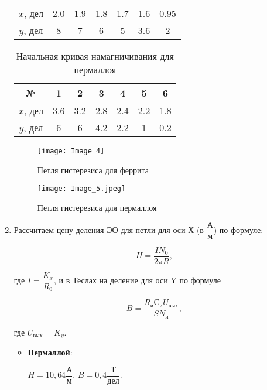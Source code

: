 \begin{enumerate}
\begin{table}[h!]
\begin{center}
\begin{tabular}{|c|c|c|c|c|c|c|}
				$ x $, дел & 2.0 & 1.9 & 1.8 & 1.7 & 1.6 & 0.95  \\
				$ y $, дел & 8 & 7 & 6 & 5 & 3.6 & 2  \\
				\hline
				
			\end{tabular}
		\end{center}
	\end{table}
	

	
	
	\begin{table}[h!]
		\caption{Начальная кривая намагничивания для пермаллоя}
		\begin{center}
			\begin{tabular}{|c|c|c|c|c|c|c|} 
				\hline 
				№ &  1 &  2 & 3 & 4 & 5 &  6    \\ 	\hline
				
				$ x $, дел & 3.6 & 3.2 & 2.8 & 2.4 & 2.2 & 1.8  \\
				$ y $, дел & 6 & 6 & 4.2 & 2.2 & 1 & 0.2  \\
				\hline
				
			\end{tabular}
		\end{center}
	\end{table}

\begin{figure}[h!]
	\centering
	\texttt{[image: Image\_4]}
	\caption{Петля гистерезиса для феррита}
\end{figure}

\newpage

\begin{figure}[h!]
	\centering
	\texttt{[image: Image\_5.jpeg]}
	\caption{Петля гистерезиса для пермаллоя}
\end{figure}

\item  Рассчитаем  цену деления ЭО для петли для оси Х (в $\dfrac{А}{м}$) по формуле:

$$H=\dfrac{IN_{0}}{2\pi R},$$

где $I=\dfrac{K_{x}}{R_{0}}$, и в Теслах на деление для оси Y по формуле

$$B=\dfrac{R_{и}С_{и}U_{вых}}{SN_{и}},$$

где $U_{вых}=K_{y}.$


\begin{itemize}
	
	\item	\textbf{Пермаллой}:
	
	$H=10,64 \dfrac{А}{м}.$
	$B=0,4 \dfrac{Т}{дел}.$
	

\end{itemize}
\end{enumerate}
